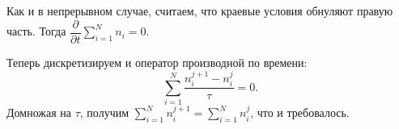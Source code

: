 \documentclass[14pt, a4paper, fleqn, twoside]{extreport}
\theoremstyle{definiton}
\theoremstyle{definition}
\begin{document}
Как и в непрерывном случае, считаем, что краевые условия обнуляют правую часть. Тогда $\dfrac{\partial}{\partial t} \displaystyle\sum_{i=1}^{N} n_i =0$.

Теперь дискретизируем и оператор производной по времени: $$\displaystyle\sum_{i=1}^{N} \dfrac{n_i^{j+1}-n_i^j}{\tau}=0.$$ Домножая на $\tau$, получим $\displaystyle\sum_{i=1}^{N} n_i^{j+1}=\displaystyle\sum_{i=1}^{N} n_i^j$, что и требовалось.

\end{document}
